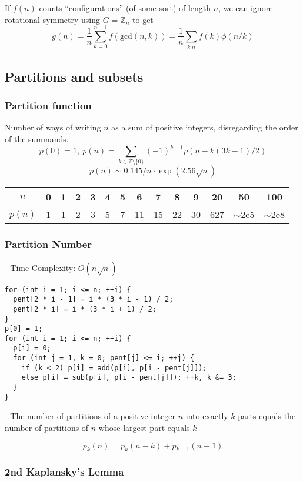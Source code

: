      If $f(n)$ counts ``configurations'' (of some sort) of length $n$, we can ignore rotational symmetry using $G = \mathbb Z_n$ to get
     \[ g(n) = \frac 1 n \sum_{k=0}^{n-1}{f(\text{gcd}(n, k))} = \frac 1 n \sum_{k|n}{f(k)\phi(n/k)} \]

\subsection{Partitions and subsets}
  \subsubsection{Partition function}
    Number of ways of writing $n$ as a sum of positive integers, disregarding the order of the summands.
    \[ p(0) = 1,\ p(n) = \sum_{k \in \mathbb Z \setminus \{0\}}{(-1)^{k+1} p(n - k(3k-1) / 2)} \]
    \[ p(n) \sim 0.145 / n \cdot \exp(2.56 \sqrt{n}) \]

    \begin{center}
    \begin{tabular}{c|c@{\ }c@{\ }c@{\ }c@{\ }c@{\ }c@{\ }c@{\ }c@{\ }c@{\ }c@{\ }c@{\ }c@{\ }c}
      $n$    & 0 & 1 & 2 & 3 & 4 & 5 & 6  & 7  & 8  & 9  & 20  & 50  & 100 \\ \hline
      $p(n)$ & 1 & 1 & 2 & 3 & 5 & 7 & 11 & 15 & 22 & 30 & 627 & $\mathtt{\sim}$2e5 & $\mathtt{\sim}$2e8 \\
    \end{tabular}
    \end{center}

  \subsubsection{Partition Number}

- Time Complexity: $ O(n\sqrt{n}) $
\begin{verbatim}
for (int i = 1; i <= n; ++i) {
  pent[2 * i - 1] = i * (3 * i - 1) / 2;
  pent[2 * i] = i * (3 * i + 1) / 2;
}
p[0] = 1;
for (int i = 1; i <= n; ++i) {
  p[i] = 0;
  for (int j = 1, k = 0; pent[j] <= i; ++j) {
    if (k < 2) p[i] = add(p[i], p[i - pent[j]]);
    else p[i] = sub(p[i], p[i - pent[j]]); ++k, k &= 3;
  }
}
\end{verbatim}
- The number of partitions of a positive integer \( n \) into exactly \( k \) parts equals the number of partitions of \( n \) whose largest part equals \( k \)

\[ p_k(n) = p_k(n - k) + p_{k - 1}(n - 1) \]

\subsubsection{2nd Kaplansky's Lemma}

